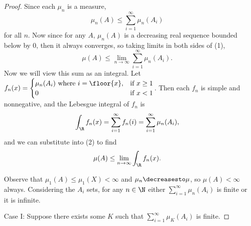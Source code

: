 \documentclass[12pt,letterpaper]{article}
\begin{document}
\begin{enumerate}
\begin{proof}
Since each $\mu_n$ is a measure,
\begin{equation}
\mu_n(A)\leq\sum_{i=1}^\infty\mu_n(A_i)
\end{equation}
for all $n$. Now since for any $A$, $\mu_n(A)$ is a decreasing real sequence bounded below by 0, then it always converges, so taking limits in both sides of (1), 
\begin{equation}
\mu(A)\leq\lim_{n\to\infty}\sum_{i=1}^\infty \mu_n(A_i).
\end{equation}
Now we will view this sum as an integral. Let $f_n(x)=
\begin{cases}
\mu_n(A_i) \text{ where } i=\floor{x}, &\text{if } x\geq1\\
0 &\text{if } x<1
\end{cases}$.
Then each $f_n$ is simple and nonnegative, and the Lebesgue integral of $f_n$ is
$$\int_\R f_n(x)=\sum_{i=1}^\infty f_n(i)=\sum_{i=1}^\infty \mu_n(A_i),$$
and we can substitute into (2) to find 
\begin{equation}
\mu(A)\leq \lim_{n\to\infty}\int_\R f_n(x).
\end{equation}

Observe that $\mu_1(A)\leq\mu_1(X)<\infty$ and $\mu_n\decreasesto\mu$, so $\mu(A)<\infty$ always. Considering the $A_i$ sets, for any $n\in\N$ either $\sum_{i=1}^\infty\mu_n(A_i)$ is finite or it is infinite. 

Case I: Suppose there exists some $K$ such that  $\sum_{i=1}^\infty\mu_K(A_i)$ is finite. 


\end{proof}
\end{enumerate}
\end{document}
